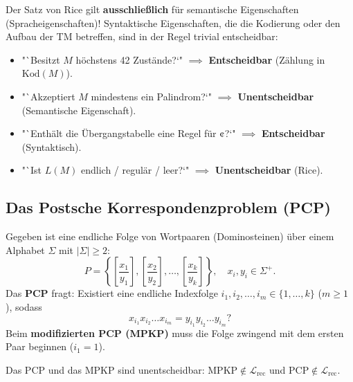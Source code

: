 \begin{important}
    Der Satz von Rice gilt \textbf{ausschließlich} für semantische Eigenschaften (Spracheigenschaften)! Syntaktische Eigenschaften, die die Kodierung oder den Aufbau der TM betreffen, sind in der Regel trivial entscheidbar:
    \begin{itemize}
        \item "`Besitzt $M$ höchstens 42 Zustände?`" $\implies$ \textbf{Entscheidbar} (Zählung in $\mathrm{Kod}(M)$).
        \item "`Akzeptiert $M$ mindestens ein Palindrom?`" $\implies$ \textbf{Unentscheidbar} (Semantische Eigenschaft).
        \item "`Enthält die Übergangstabelle eine Regel für $\text{\textcent}$?`" $\implies$ \textbf{Entscheidbar} (Syntaktisch).
        \item "`Ist $L(M)$ endlich / regulär / leer?`" $\implies$ \textbf{Unentscheidbar} (Rice).
    \end{itemize}
\end{important}

\subsection{Das Postsche Korrespondenzproblem (PCP)}

\begin{definition}
    Gegeben ist eine endliche Folge von Wortpaaren (Dominosteinen) über einem Alphabet $\Sigma$ mit $|\Sigma| \ge 2$:
    \[
        P = \left\{ \left[\frac{x_1}{y_1}\right], \left[\frac{x_2}{y_2}\right], \dots, \left[\frac{x_k}{y_k}\right] \right\}, \quad x_i, y_i \in \Sigma^+.
    \]
    Das \textbf{PCP} fragt: Existiert eine endliche Indexfolge $i_1, i_2, \dots, i_m \in \{1, \dots, k\}$ ($m \ge 1$), sodass
    \[
        x_{i_1} x_{i_2} \dots x_{i_m} = y_{i_1} y_{i_2} \dots y_{i_m}?
    \]
    Beim \textbf{modifizierten PCP (MPKP)} muss die Folge zwingend mit dem ersten Paar beginnen ($i_1 = 1$).
\end{definition}

\begin{theorem}
    Das PCP und das MPKP sind unentscheidbar: $\mathrm{MPKP} \notin \mathcal{L}_{\mathrm{rec}}$ und $\mathrm{PCP} \notin \mathcal{L}_{\mathrm{rec}}$.
\end{theorem}

